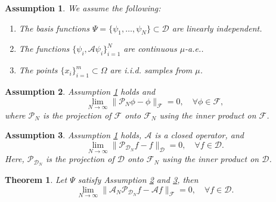 \documentclass{article}[11]
\newtheorem{theorem}{Theorem}
\newtheorem{assumption}{Assumption}
\begin{document}
\begin{assumption}\label{assumption_1}
	We assume the following:
	\begin{enumerate}
		\item The basis functions $\Psi = \{ \psi_1, \dots, \psi_N \} \subset \mathcal{D}$ are linearly independent.
		\item The functions $\{ \psi_i, \mathcal{A} \psi_i \}_{i=1}^N$ are continuous $\mu$-a.e..
		\item The points $\{ x_i \}_{i=1}^m \subset \Omega$ are i.i.d. samples from $\mu$.
	\end{enumerate}
\end{assumption}

\begin{assumption}\label{assumption_2}
	Assumption \ref{assumption_1} holds and
	\[
	\lim_{N \to \infty} \| \mathcal{P}_N \phi - \phi \|_{\mathcal{F}} = 0, \quad \forall \phi \in \mathcal{F},
	\]
	where $\mathcal{P}_N$ is the projection of $\mathcal{F}$ onto $\mathcal{F}_N$ using the inner product on $\mathcal{F}$.	
\end{assumption}

\begin{assumption}\label{assumption_3}
	Assumption \ref{assumption_1} holds, $\mathcal{A}$ is a closed operator, and
	\[
	\lim_{N \to \infty} \| \mathcal{P}_{\mathcal{D}_N} f - f \|_{\mathcal{D}} = 0, \quad \forall f \in \mathcal{D}.
	\]
	Here, $\mathcal{P}_{\mathcal{D}_N}$ is the projection of $\mathcal{D}$ onto $\mathcal{F}_N$ using the inner product on $\mathcal{D}$.
\end{assumption}

\begin{theorem}
	Let $\Psi$ satisfy Assumption \ref{assumption_2} and \ref{assumption_3}, then
	\[
	\lim_{N \to \infty} \| \mathcal{A}_N \mathcal{P}_{\mathcal{D}_N} f - \mathcal{A} f \|_{\mathcal{F}} = 0, \quad \forall f \in \mathcal{D}.
	\]
\end{theorem}
\end{document}
